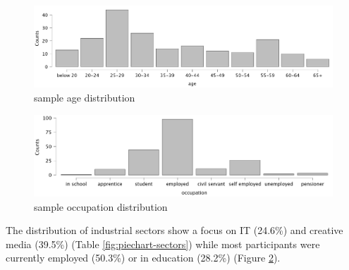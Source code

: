 \documentclass[
  a4paper,  %
  twoside,  %
  bibliography=totoc,
  headsepline,
  cleardoublepage=empty,
  parskip=half,
  draft=false
]{scrbook}
\begin{document}
\begin{figure}[h]
  \centering
  \includegraphics[width=1\textwidth]{graphics/images/statistics/age-plot.png}
  \caption{sample age distribution}
  \label{fig:age-distribution}
\end{figure}
\begin{figure}[h]
  \centering
  \includegraphics[width=1\textwidth]{graphics/images/statistics/occupation.png}
  \caption{sample occupation distribution}
  \label{fig:occupation-plot}
\end{figure}
The distribution of industrial sectors show a focus on IT (24.6\%) and creative media (39.5\%) (Table \ref{fig:piechart-sectors}) while most participants were currently employed (50.3\%) or in education (28.2\%) (Figure \ref{fig:occupation-plot}). 
\end{document}
